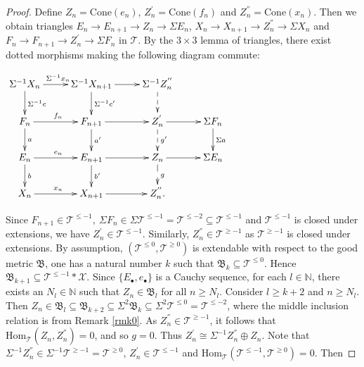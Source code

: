 \documentclass[11pt,a4paper]{amsart}
\numberwithin{equation}{section} \theoremstyle{plain}
\numberwithin{equation}{section} \theoremstyle{definition}
\begin{document}
\begin{proof}
Define $Z_{n}=\mathrm{Cone}(e_{n})$, $Z_{n}^{'}=\mathrm{Cone}(f_{n})$ and $Z_{n}^{''}=\mathrm{Cone}(x_{n})$. Then we obtain triangles $E_{n}\rightarrow E_{n+1}\rightarrow Z_{n}\rightarrow \Sigma E_{n}$, $X_{n}\rightarrow X_{n+1}\rightarrow Z_{n}^{''}\rightarrow \Sigma X_{n}$ and $F_{n}\rightarrow F_{n+1}\rightarrow Z_{n}^{'}\rightarrow \Sigma F_{n}$ in $\mathcal{T}$. By the $3\times3$ lemma of triangles, there exist dotted morphisms making the following diagram commute:
\begin{center} $\xymatrix@C=25pt@R=20pt{
\Sigma^{-1}X_{n}\ar[d]^{\Sigma^{-1}c}\ar[r]^{\Sigma^{-1}x_{n}} &\Sigma^{-1}X_{n+1}\ar[d]^{\Sigma^{-1}c'}\ar[r]^{}&\Sigma^{-1}Z_{n}^{''}\ar@{-->}[d]^{}&\\
F_{n}\ar[d]^{a}\ar[r]^{f_{n}} &F_{n+1}\ar[d]^{a'}\ar[r]^{}&Z_{n}^{'}\ar@{-->}[d]^{g'}\ar[r]^{} &\Sigma F_{n} \ar[d]^{\Sigma a}&\\
E_{n}\ar[d]^{b}\ar[r]^{e_{n}} &E_{n+1}\ar[d]^{b'}\ar[r]^{} &Z_{n}\ar@{-->}[d]^{g}\ar[r]^{} &\Sigma E_{n}&\\
X_{n}\ar[r]^{x_{n}}& X_{n+1}\ar[r]^{}&Z_{n}^{''}.&}$
\end{center}
Since $F_{n+1}\in\mathcal{T}^{\leq-1},~ \Sigma F_{n}\in\Sigma\mathcal{T}^{\leq-1}=\mathcal{T}^{\leq-2}\subseteq\mathcal{T}^{\leq-1}$ and $\mathcal{T}^{\leq-1}$ is closed under extensions, we have $Z_{n}^{'}\in\mathcal{T}^{\leq-1}$. Similarly, $Z_{n}^{''}\in\mathcal{T}^{\geq-1}$ as $\mathcal{T}^{\geq-1}$ is closed under extensions. By assumption, $(\mathcal{T}^{\leq0},\mathcal{T}^{\geq0})$ is extendable with respect to the good metric $\mathfrak{B}$, one has a natural number $k$ such that $\mathfrak{B}_{k}\subseteq\mathcal{T}^{\leq0}$. Hence $\mathfrak{B}_{k+1}\subseteq\mathcal{T}^{\leq-1}*\mathcal{X}$. Since $\{E_{\bullet},e_{\bullet}\}$ is a Cauchy sequence, for each $l\in\mathbb{N}$, there exists an $N_{l}\in\mathbb{N}$ such that $Z_{n}\in\mathfrak{B}_{l}$ for all $n\geq N_{l}$. Consider $l\geq k+2$ and $n\geq N_{l}$. Then $Z_{n}\in\mathfrak{B}_{l}\subseteq\mathfrak{B}_{k+2}\subseteq\Sigma^{2}\mathfrak{B}_{k}\subseteq\Sigma^{2}\mathcal{T}^{\leq0}=\mathcal{T}^{\leq-2}$, where the middle inclusion relation is from Remark \ref{rmk0}. As $Z_{n}^{''}\in\mathcal{T}^{\geq-1}$, it follows that $\mathrm{Hom}_{\mathcal{T}}(Z_{n},Z_{n}^{''})=0$, and so $g=0$. Thus $Z_{n}^{'}\cong \Sigma^{-1}Z_{n}^{''}\oplus Z_{n}$. Note that $\Sigma^{-1}Z_{n}^{''}\in\Sigma^{-1}\mathcal{T}^{\geq-1}=\mathcal{T}^{\geq0}$, $Z_{n}^{'}\in\mathcal{T}^{\leq-1}$ and $\mathrm{Hom}_{\mathcal{T}}(\mathcal{T}^{\leq-1},\mathcal{T}^{\geq0})=0$. Then

\end{proof}
\end{document}
